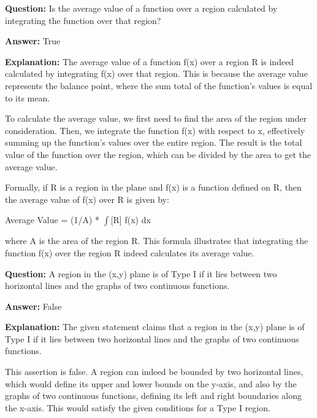 \documentclass{article}
\begin{document}
                \vspace{0.5cm} 
        
            
                \textbf {Question:} Is the average value of a function over a region calculated by integrating the function over that region?
                
                \textbf{Answer:} True

                \textbf{Explanation:} The average value of a function f(x) over a region R is indeed calculated by integrating f(x) over that region. This is because the average value represents the balance point, where the sum total of the function's values is equal to its mean.

To calculate the average value, we first need to find the area of the region under consideration. Then, we integrate the function f(x) with respect to x, effectively summing up the function's values over the entire region. The result is the total value of the function over the region, which can be divided by the area to get the average value.

Formally, if R is a region in the plane and f(x) is a function defined on R, then the average value of f(x) over R is given by:

Average Value = (1/A) * \ensuremath{\int}[R] f(x) dx

where A is the area of the region R. This formula illustrates that integrating the function f(x) over the region R indeed calculates its average value.
                
                \vspace{0.5cm} 
        
            
                \textbf {Question:} A region in the (x,y) plane is of Type I if it lies between two horizontal lines and the graphs of two continuous functions.
                
                \textbf{Answer:} False

                \textbf{Explanation:} The given statement claims that a region in the (x,y) plane is of Type I if it lies between two horizontal lines and the graphs of two continuous functions.

This assertion is false. A region can indeed be bounded by two horizontal lines, which would define its upper and lower bounds on the y-axis, and also by the graphs of two continuous functions, defining its left and right boundaries along the x-axis. This would satisfy the given conditions for a Type I region.
\end{document}
